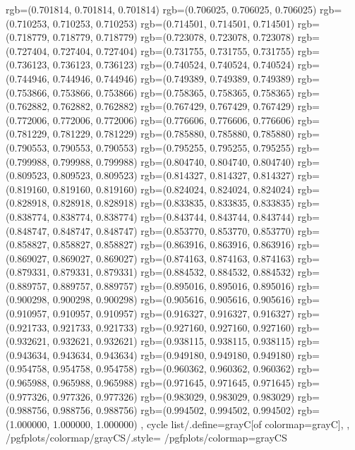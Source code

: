 {{{					rgb=(0.701814, 0.701814, 0.701814)
					rgb=(0.706025, 0.706025, 0.706025)
					rgb=(0.710253, 0.710253, 0.710253)
					rgb=(0.714501, 0.714501, 0.714501)
					rgb=(0.718779, 0.718779, 0.718779)
					rgb=(0.723078, 0.723078, 0.723078)
					rgb=(0.727404, 0.727404, 0.727404)
					rgb=(0.731755, 0.731755, 0.731755)
					rgb=(0.736123, 0.736123, 0.736123)
					rgb=(0.740524, 0.740524, 0.740524)
					rgb=(0.744946, 0.744946, 0.744946)
					rgb=(0.749389, 0.749389, 0.749389)
					rgb=(0.753866, 0.753866, 0.753866)
					rgb=(0.758365, 0.758365, 0.758365)
					rgb=(0.762882, 0.762882, 0.762882)
					rgb=(0.767429, 0.767429, 0.767429)
					rgb=(0.772006, 0.772006, 0.772006)
					rgb=(0.776606, 0.776606, 0.776606)
					rgb=(0.781229, 0.781229, 0.781229)
					rgb=(0.785880, 0.785880, 0.785880)
					rgb=(0.790553, 0.790553, 0.790553)
					rgb=(0.795255, 0.795255, 0.795255)
					rgb=(0.799988, 0.799988, 0.799988)
					rgb=(0.804740, 0.804740, 0.804740)
					rgb=(0.809523, 0.809523, 0.809523)
					rgb=(0.814327, 0.814327, 0.814327)
					rgb=(0.819160, 0.819160, 0.819160)
					rgb=(0.824024, 0.824024, 0.824024)
					rgb=(0.828918, 0.828918, 0.828918)
					rgb=(0.833835, 0.833835, 0.833835)
					rgb=(0.838774, 0.838774, 0.838774)
					rgb=(0.843744, 0.843744, 0.843744)
					rgb=(0.848747, 0.848747, 0.848747)
					rgb=(0.853770, 0.853770, 0.853770)
					rgb=(0.858827, 0.858827, 0.858827)
					rgb=(0.863916, 0.863916, 0.863916)
					rgb=(0.869027, 0.869027, 0.869027)
					rgb=(0.874163, 0.874163, 0.874163)
					rgb=(0.879331, 0.879331, 0.879331)
					rgb=(0.884532, 0.884532, 0.884532)
					rgb=(0.889757, 0.889757, 0.889757)
					rgb=(0.895016, 0.895016, 0.895016)
					rgb=(0.900298, 0.900298, 0.900298)
					rgb=(0.905616, 0.905616, 0.905616)
					rgb=(0.910957, 0.910957, 0.910957)
					rgb=(0.916327, 0.916327, 0.916327)
					rgb=(0.921733, 0.921733, 0.921733)
					rgb=(0.927160, 0.927160, 0.927160)
					rgb=(0.932621, 0.932621, 0.932621)
					rgb=(0.938115, 0.938115, 0.938115)
					rgb=(0.943634, 0.943634, 0.943634)
					rgb=(0.949180, 0.949180, 0.949180)
					rgb=(0.954758, 0.954758, 0.954758)
					rgb=(0.960362, 0.960362, 0.960362)
					rgb=(0.965988, 0.965988, 0.965988)
					rgb=(0.971645, 0.971645, 0.971645)
					rgb=(0.977326, 0.977326, 0.977326)
					rgb=(0.983029, 0.983029, 0.983029)
					rgb=(0.988756, 0.988756, 0.988756)
					rgb=(0.994502, 0.994502, 0.994502)
					rgb=(1.000000, 1.000000, 1.000000)
			},
		cycle list/.define={grayC}{[of colormap=grayC]},
		},
		/pgfplots/colormap/grayCS/.style={
			/pgfplots/colormap={grayCS}{%
}}}
